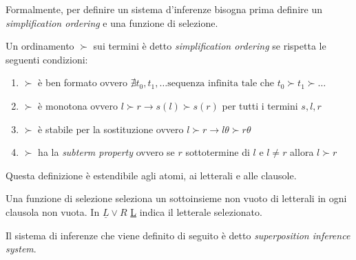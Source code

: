 Formalmente, per definire un sistema d'inferenze bisogna prima definire un \emph{simplification ordering} e una funzione di selezione.
\begin{definition}
    Un ordinamento $\succ$ sui termini è detto \emph{simplification ordering} se rispetta le seguenti condizioni:
    \begin{enumerate}
        \item $\succ$ è ben formato ovvero $\nexists t_0,t_1, \dots \text{sequenza infinita tale che } t_0 \succ t_1 \succ \dots$
        \item $\succ$ è monotona ovvero $l \succ r \rightarrow s(l)\succ s(r)$ per tutti i termini $s,l,r$
        \item $\succ$ è stabile per la sostituzione ovvero $l \succ r \rightarrow l\theta \succ r\theta$
        \item $\succ$ ha la \emph{subterm property} ovvero se $r$ sottotermine di $l$ e $l\neq r$ allora $l\succ r$   
    \end{enumerate}
\end{definition}
Questa definizione è estendibile agli atomi, ai letterali e alle clausole.
\begin{definition}
    Una funzione di selezione seleziona un sottoinsieme non vuoto di letterali in ogni clausola non vuota. In $\underline{L}\lor R$ \underline{L} indica il letterale selezionato.
\end{definition}
Il sistema di inferenze che viene definito di seguito è detto \emph{superposition inference system}.
